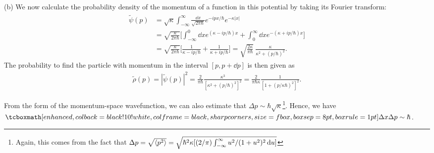 {(b) We now calculate the probability density of the momentum of a function in this potential by taking its Fourier transform:
\begin{eqnarray}
    \begin{aligned}
        \tilde{\psi}(p) &= \sqrt{\kappa} \int_{-\infty}^{\infty} \frac{\dd{x}}{\sqrt{2 \pi \hbar}} e^{-i p x / \hbar} e^{-\kappa |x|} \\
                        &= \sqrt{\frac{\kappa}{2 \pi \hbar}} \Big[ \int_{-\infty}^{0} \dd{x} e^{(\kappa - i p / \hbar) x} + \int_{0}^{\infty} \dd{x} e^{-( \kappa + ip / \hbar ) x} \Big] \\
                        &= \sqrt{\frac{\kappa}{2 \pi \hbar}} \Big[ \frac{1}{\kappa - ip/\hbar} + \frac{1}{\kappa + ip/\hbar} \Big] = \sqrt{\frac{2 \kappa}{\pi \hbar}} ~ \frac{\kappa}{\kappa^2 + (p / \hbar)^2}
    .\end{aligned}
\end{eqnarray}
The probability to find the particle with momentum in the interval $[p,p+\dd{p}]$ is then given as
\begin{eqnarray}
    \tilde{\rho}(p) = |\tilde{\psi}(p)|^2 = \frac{2}{\pi \hbar} \frac{\kappa^3}{[\kappa^2 + (p/\hbar)^2]^2} = \frac{2}{\pi \hbar \kappa} \frac{1}{[1 + (p/\kappa \hbar)^2]^2}
.\end{eqnarray}

From the form of the momentum-space wavefunction, we can also estimate that $\Delta p \sim \hbar \sqrt{\kappa}$\footnote{Again, this comes from the fact that $\Delta p = \sqrt{\expval{p^2}} = \sqrt{\hbar^2 \kappa [ (2/\pi)\int_{-\infty}^{\infty} u^2/(1 + u^2)^2 \dd{u} ]}$}.
Hence, we have $\eqbox{ \Delta x \Delta p \sim \hbar }$.

}




